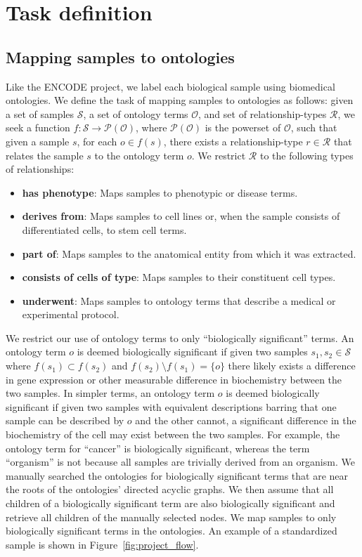 \section{Task definition}

\subsection{Mapping samples to ontologies}

Like the ENCODE project, we label each biological sample using biomedical ontologies. We define the task of mapping samples to ontologies as follows: given a set of samples $\mathcal{S}$, a set of ontology terms $\mathcal{O}$, and set of relationship-types $\mathcal{R}$, we seek a function $f: \mathcal{S} \rightarrow \mathscr{P}(\mathcal{O})$, where $\mathscr{P}(\mathcal{O})$ is the powerset of $\mathcal{O}$, such that given a sample $s$, for each $o \in f(s)$, there exists a relationship-type $r \in \mathcal{R}$ that relates the sample $s$ to the ontology term $o$.   We restrict $\mathcal{R}$ to the following types of relationships:
\begin{itemize}
    \item \textbf{has phenotype}:  Maps samples to phenotypic or disease terms. 
    \item \textbf{derives from}:   Maps samples to cell lines or, when the sample consists of differentiated cells, to stem cell terms. 
    \item \textbf{part of}:    Maps samples to the anatomical entity from which it was extracted. 
    \item \textbf{consists of cells of type}:  Maps samples to their constituent cell types. 
    \item \textbf{underwent}: Maps samples to ontology terms that describe a medical or experimental protocol. \vspace*{1pt}
\end{itemize}
We restrict our use of ontology terms to only ``biologically significant'' terms.  An ontology term $o$ is deemed biologically significant if given two samples $s_1, s_2 \in \mathcal{S}$  where $f(s_1) \subset f(s_2)$ and $f(s_2) \setminus f(s_1) = \{o\}$
 there likely exists a difference in gene expression or other measurable difference in biochemistry between the two samples.  In simpler terms, an ontology term $o$ is deemed biologically significant if given two samples with equivalent descriptions barring that one sample can be described by $o$ and the other cannot, a significant difference in the biochemistry of the cell may exist between the two samples. For example, the ontology term for ``cancer'' is biologically significant, whereas the term ``organism'' is not because all samples are trivially derived from an organism.   We manually searched the ontologies for biologically significant terms that are near the roots of the ontologies' directed acyclic graphs.  We then assume that all children of a biologically significant term are also biologically significant and retrieve all children of the manually selected nodes. We map samples to only biologically significant terms in the ontologies.  An example of a standardized sample is shown in Figure~\ref{fig:project_flow}.
 
